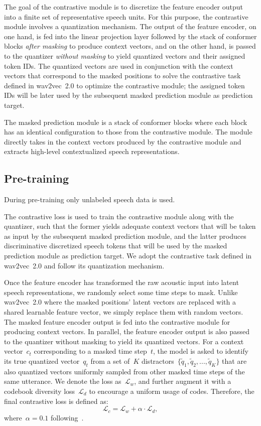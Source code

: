 \documentclass{article}
\begin{document}
The goal of the contrastive module is to discretize the feature encoder output into a finite set of representative speech units.
For this purpose, the contrastive module involves a quantization mechanism.
The output of the feature encoder, on one hand, is fed into the linear projection layer followed by the stack of conformer blocks {\it after masking} to produce context vectors, and on the other hand, is passed to the quantizer {\it without masking} to yield quantized vectors and their assigned token IDs.
The quantized vectors are used in conjunction with the context vectors that correspond to the masked positions to solve the contrastive task defined in wav2vec~2.0 to optimize the contrastive module; the assigned token IDs will be later used by the subsequent masked prediction module as prediction target.

The masked prediction module is a stack of conformer blocks where each block has an identical configuration to those from the contrastive module.
The module directly takes in the context vectors produced by the contrastive module and extracts high-level contextualized speech representations.

\subsection{Pre-training}
During pre-training only unlabeled speech data is used.

The contrastive loss is used to train the contrastive module along with the quantizer, such that the former yields adequate context vectors that will be taken as input by the subsequent masked prediction module, and the latter produces discriminative discretized speech tokens that will be used by the masked prediction module as prediction target.
We adopt the contrastive task defined in wav2vec~2.0 and follow its quantization mechanism.

Once the feature encoder has transformed the raw acoustic input into latent speech representations, we randomly select some time steps to mask.
Unlike wav2vec~2.0 where the masked positions' latent vectors are replaced with a shared learnable feature vector, we simply replace them with random vectors.
The masked feature encoder output is fed into the contrastive module for producing context vectors.
In parallel, the feature encoder output is also passed to the quantizer without masking to yield its quantized vectors.
For a context vector~$c_{t}$ corresponding to a masked time step~$t$, the model is asked to identify its true quantized vector~$q_{t}$ from a set of~$K$ distractors~$\{\tilde{q}_{1}, \tilde{q}_{2}, ..., \tilde{q}_{K}\}$ that are also quantized vectors uniformly sampled from other masked time steps of the same utterance.
We denote the loss as~$\mathcal{L}_{w}$, and further augment it with a codebook diversity loss~$\mathcal{L}_{d}$ to encourage a uniform usage of codes.
Therefore, the final contrastive loss is defined as:
\begin{equation}
  \mathcal{L}_{c} = \mathcal{L}_{w} + \alpha \cdot \mathcal{L}_{d},
  \label{eq:contrastive_loss}
\end{equation}
where~$\alpha = 0.1$ following~\cite{baevski2020wav2vec}.
\end{document}

